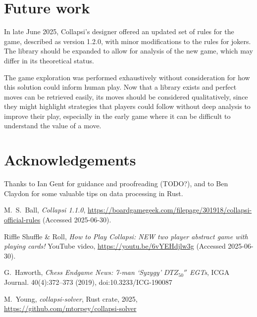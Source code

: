 \documentclass[a4paper, twocolumn]{article}
\begin{document}
\section{Future work}

In late June 2025, Collapsi's designer offered an updated set of rules for the
game, described as version 1.2.0, with minor modifications to the rules for
jokers. The library should be expanded to allow for analysis of the new game,
which may differ in its theoretical status.

The game exploration was performed exhaustively without consideration for how
this solution could inform human play. Now that a library exists and perfect
moves can be retrieved easily, its moves should be considered qualitatively,
since they might highlight strategies that players could follow without deep
analysis to improve their play, especially in the early game where it can be
difficult to understand the value of a move.


\section{Acknowledgements}

Thanks to Ian Gent for guidance and proofreading (TODO?), and to Ben Claydon for
some valuable tips on data processing in Rust.


\begin{thebibliography}{9}

  M.~S.~Ball,
  \textit{Collapsi 1.1.0},
  \url{https://boardgamegeek.com/filepage/301918/collapsi-official-rules}
  (Accessed 2025-06-30).

  Riffle Shuffle \& Roll,
  \textit{How to Play Collapsi: NEW two player abstract game with playing cards!}
  YouTube video,
  \url{https://youtu.be/6vYEHdjlw3g}
  (Accessed 2025-06-30).

  G.~Haworth,
  \textit{Chess Endgame News: 7-man `Syzygy' $DTZ_{50}''$ EGTs},
  ICGA Journal. 40(4):372--373 (2019),
  doi:10.3233/ICG-190087

  M.~Young,
  \textit{collapsi-solver},
  Rust crate,
  2025,
  \url{https://github.com/mtorpey/collapsi-solver}

\end{thebibliography}
\end{document}
